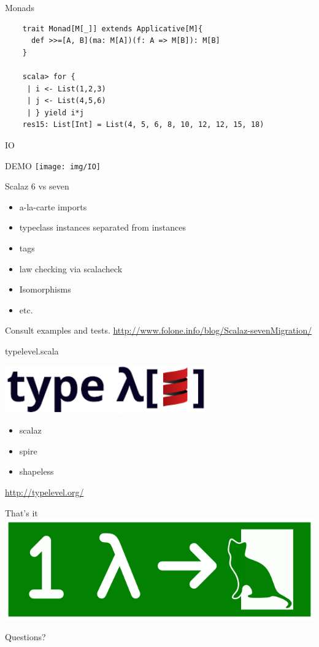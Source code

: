 \documentclass{beamer}
\begin{document}
\begin{frame}[fragile]{Monads}
  \begin{verbatim}
    trait Monad[M[_]] extends Applicative[M]{
      def >>=[A, B](ma: M[A])(f: A => M[B]): M[B]
    }

    scala> for {
     | i <- List(1,2,3)
     | j <- List(4,5,6)
     | } yield i*j
    res15: List[Int] = List(4, 5, 6, 8, 10, 12, 12, 15, 18)
  \end{verbatim}
\end{frame}

\begin{frame}[fragile]{IO}
  \begin{center}
    {\Huge DEMO }\newline
    \texttt{[image: img/IO]}
  \end{center}
\end{frame}

\begin{frame}[fragile]{Scalaz 6 vs seven}
  \begin{center}
    \begin{itemize}
      \item a-la-carte imports
      \item typeclass instances separated from instances
      \item tags
      \item law checking via scalacheck
      \item Isomorphisms
      \item etc.
    \end{itemize}
  Consult examples and tests.
  \url{http://www.folone.info/blog/Scalaz-sevenMigration/}
  \end{center}
\end{frame}

\begin{frame}[fragile]{typelevel.scala}
  \begin{center}
    \includegraphics[scale=0.5]{img/typelevel}
      \begin{itemize}
        \item scalaz
        \item spire
        \item shapeless
      \end{itemize}
    {\large \url{http://typelevel.org/} }
  \end{center}
\end{frame}

\begin{frame}{That's it}
  \includegraphics[scale=0.4]{img/escape}\newline
  \Huge \centerline{Questions?}
\end{frame}
\end{document}
